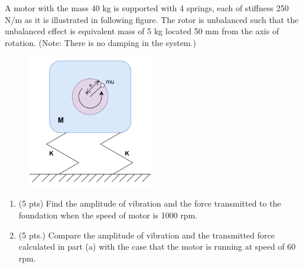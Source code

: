 \section{}

A motor with the mass 40 kg is supported with 4 springs, each of stiffness 250 N/m as it is illustrated in following figure. The rotor is unbalanced such that the unbalanced effect is equivalent mass of 5 kg located 50 mm from the axis of rotation. (Note: There is no damping in the system.)

\begin{figure}[h]
    \centering
    \includegraphics[width=0.5\textwidth]{Questions/Figures/q5 problem diagram.png}
\end{figure}

\begin{enumerate}[label=(\alph*)]
    \item (5 pts) Find the amplitude of vibration and the force transmitted to the foundation when the speed of motor is 1000 rpm.
    \item (5 pts.) Compare the amplitude of vibration and the transmitted force calculated in part (a) with the case that the motor is running at speed of 60 rpm.
\end{enumerate}

